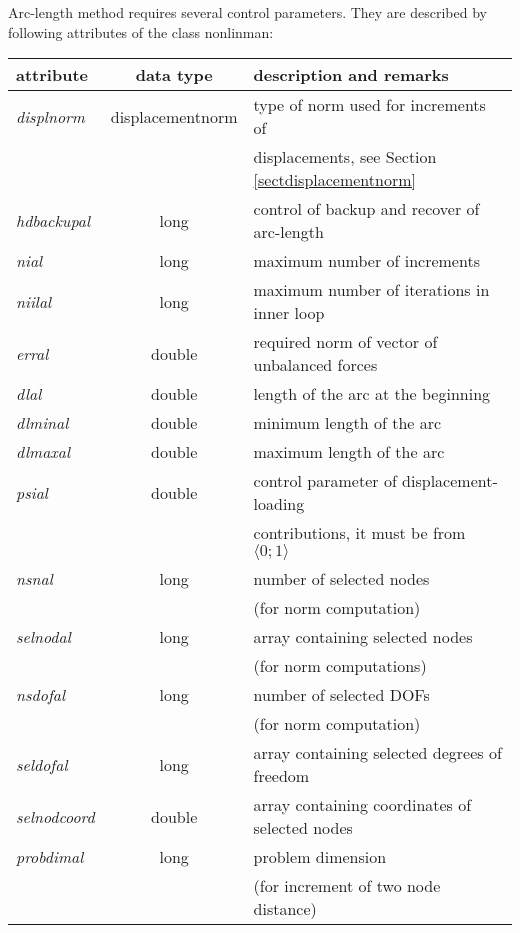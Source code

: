 Arc-length method requires several control parameters.
They are described by following attributes of the class {\sf nonlinman}:
\begin{center}
\begin{tabular}{|l|c|l|}
\hline
attribute & data type & description and remarks
\\ \hline
{\it displnorm} & {\sf displacementnorm} & type of norm used for increments of
\\
 & & displacements, see Section \ref{sectdisplacementnorm}
\\ \hline
{\it hdbackupal} & {\sf long} & control of backup and recover of arc-length
\\ \hline
{\it nial} &  {\sf long} & maximum number of increments
\\ \hline
{\it niilal} & {\sf long} & maximum number of iterations in inner loop
\\ \hline
{\it erral} & {\sf double} & required norm of vector of unbalanced forces
\\ \hline
{\it dlal} & {\sf double} & length of the arc at the beginning
\\ \hline
{\it dlminal} & {\sf double} & minimum length of the arc
\\ \hline
{\it dlmaxal} & {\sf double} & maximum length of the arc
\\ \hline
{\it psial} & {\sf double} & control parameter of displacement-loading
\\
 & & contributions, it must be from $\langle0;1\rangle$
\\ \hline
{\it nsnal} & {\sf long} & number of selected nodes
\\
 & & (for norm computation)
\\ \hline
{\it selnodal} & {\sf long} & array containing selected nodes
\\
 & & (for norm computations)
\\ \hline
{\it nsdofal} & {\sf long} & number of selected DOFs
\\
 & & (for norm computation)
\\ \hline
{\it seldofal} & {\sf long} & array containing selected degrees of freedom
\\ \hline
{\it selnodcoord} & {\sf double} & array containing coordinates of selected nodes
\\ \hline
{\it probdimal} & {\sf long} & problem dimension
\\
 & & (for increment of two node distance)
\\ \hline
\end{tabular}
\end{center}


